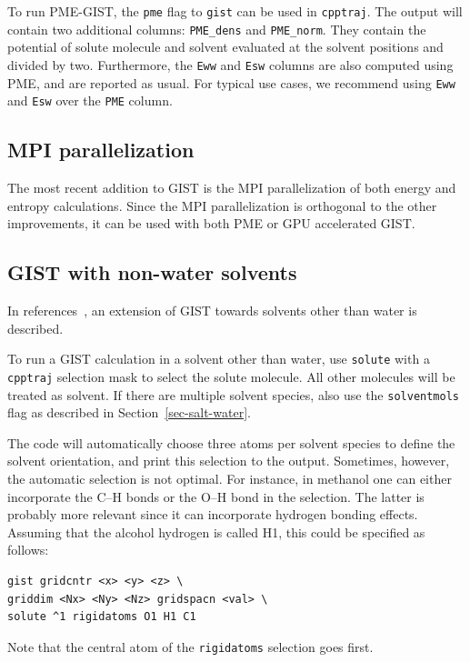 \documentclass[9pt,tutorial]{livecoms}
\newcommand{\software}{\texttt}
\newcommand\inlinecode{\texttt}
\begin{document}
To run PME-GIST, the \inlinecode{pme} flag to \inlinecode{gist} can be used in \software{cpptraj}.
The output will contain two additional columns: \inlinecode{PME\_dens} and \inlinecode{PME\_norm}.
They contain the potential of solute molecule and solvent evaluated at the solvent positions and divided by two.
Furthermore, the \inlinecode{Eww} and \inlinecode{Esw} columns are also computed using PME, and are reported as usual.
For typical use cases, we recommend using \inlinecode{Eww} and \inlinecode{Esw} over the \inlinecode{PME} column.

\subsection{MPI parallelization}
The most recent addition to GIST is the MPI parallelization of both energy and entropy calculations\cite{Roe2023-mpi-gist}.
Since the MPI parallelization is orthogonal to the other improvements, it can be used with both PME or GPU accelerated GIST.
\subsection{GIST with non-water solvents}
In references~\cite{Kraml2020,Kamenik2020-gist-macrocycles,Waibl2022-gist-solvents}, an extension of GIST towards solvents other than water is described.

To run a GIST calculation in a solvent other than water, use \inlinecode{solute} with a \software{cpptraj} selection mask to select the solute molecule.
All other molecules will be treated as solvent.
If there are multiple solvent species, also use the \inlinecode{solventmols} flag as described in Section~\ref{sec-salt-water}.

The code will automatically choose three atoms per solvent species to define the solvent orientation, and print this selection to the output.
Sometimes, however, the automatic selection is not optimal.
For instance, in methanol one can either incorporate the C--H bonds or the O--H bond in the selection.
The latter is probably more relevant since it can incorporate hydrogen bonding effects.
Assuming that the alcohol hydrogen is called H1, this could be specified as follows:

\begin{lstlisting}[style=cpptraj]
gist gridcntr <x> <y> <z> \
griddim <Nx> <Ny> <Nz> gridspacn <val> \
solute ^1 rigidatoms O1 H1 C1
\end{lstlisting}

Note that the central atom of the \inlinecode{rigidatoms} selection goes first.
\end{document}
